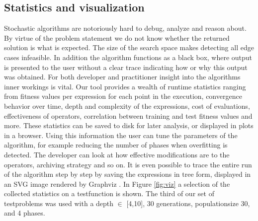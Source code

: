 \subsection{Statistics and visualization}
Stochastic algorithms are notoriously hard to debug, analyze and reason about. By virtue of the problem statement we do not know whether the returned solution is what is expected. The size of the search space makes detecting all edge cases infeasible. In addition the algorithm functions as a black box, where output is presented to the user without a clear trace indicating how or why this output was obtained. For both developer and practitioner insight into the algorithms inner workings is vital. 
Our tool provides a wealth of runtime statistics ranging from fitness values per expression for each point in the execution, convergence behavior over time, depth and complexity of the expressions, cost of evaluations, effectiveness of operators, correlation between training and test fitness values and more. These statistics can be saved to disk for later analysis, or displayed in plots in a browser. Using this information the user can tune the parameters of the algorithm, for example reducing the number of phases when overfitting is detected. The developer can look at how effective modifications are to the operators, archiving strategy and so on.
It is even possible to trace the entire run of the algorithm step by step by saving the expressions in tree form, displayed in an SVG image rendered by Graphviz \cite{graphviz}. In Figure \ref{fig:viz} a selection of the collected statistics on a testfunction is shown. The third of our set of testproblems was used with a depth $\in$ [4,10], 30 generations, populationsize 30, and 4 phases.

